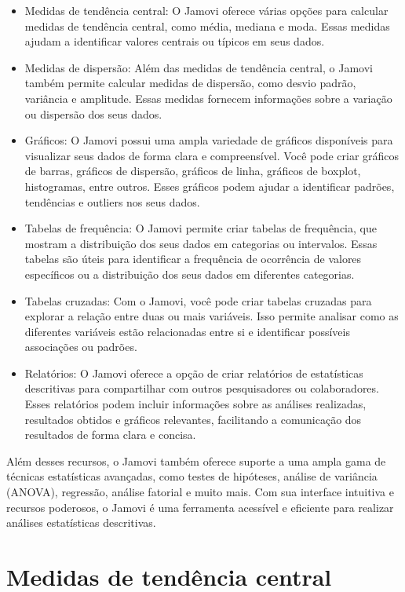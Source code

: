 \begin{itemize}
    \item Medidas de tendência central: O Jamovi oferece várias opções para calcular medidas de tendência central, como média, mediana e moda. Essas medidas ajudam a identificar valores centrais ou típicos em seus dados.
    \item Medidas de dispersão: Além das medidas de tendência central, o Jamovi também permite calcular medidas de dispersão, como desvio padrão, variância e amplitude. Essas medidas fornecem informações sobre a variação ou dispersão dos seus dados.
    \item Gráficos: O Jamovi possui uma ampla variedade de gráficos disponíveis para visualizar seus dados de forma clara e compreensível. Você pode criar gráficos de barras, gráficos de dispersão, gráficos de linha, gráficos de boxplot, histogramas, entre outros. Esses gráficos podem ajudar a identificar padrões, tendências e outliers nos seus dados.
    \item Tabelas de frequência: O Jamovi permite criar tabelas de frequência, que mostram a distribuição dos seus dados em categorias ou intervalos. Essas tabelas são úteis para identificar a frequência de ocorrência de valores específicos ou a distribuição dos seus dados em diferentes categorias.
    \item Tabelas cruzadas: Com o Jamovi, você pode criar tabelas cruzadas para explorar a relação entre duas ou mais variáveis. Isso permite analisar como as diferentes variáveis estão relacionadas entre si e identificar possíveis associações ou padrões.
    \item Relatórios: O Jamovi oferece a opção de criar relatórios de estatísticas descritivas para compartilhar com outros pesquisadores ou colaboradores. Esses relatórios podem incluir informações sobre as análises realizadas, resultados obtidos e gráficos relevantes, facilitando a comunicação dos resultados de forma clara e concisa.
\end{itemize}

Além desses recursos, o Jamovi também oferece suporte a uma ampla gama de técnicas estatísticas avançadas, como testes de hipóteses, análise de variância (ANOVA), regressão, análise fatorial e muito mais. Com sua interface intuitiva e recursos poderosos, o Jamovi é uma ferramenta acessível e eficiente para realizar análises estatísticas descritivas.

\section{Medidas de tendência central}

